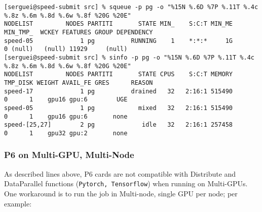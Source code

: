 
\scriptsize
\begin{verbatim}
[serguei@speed-submit src] % squeue -p pg -o "%15N %.6D %7P %.11T %.4c %.8z %.6m %.8d %.6w %.8f %20G %20E"
NODELIST         NODES PARTITI       STATE MIN_    S:C:T MIN_ME MIN_TMP_  WCKEY FEATURES GROUP DEPENDENCY
speed-05             1 pg          RUNNING    1    *:*:*     1G        0 (null)   (null) 11929     (null)
[serguei@speed-submit src] % sinfo -p pg -o "%15N %.6D %7P %.11T %.4c %.8z %.6m %.8d %.6w %.8f %20G %20E"
NODELIST         NODES PARTITI       STATE CPUS    S:C:T MEMORY TMP_DISK WEIGHT AVAIL_FE GRES      REASON
speed-17             1 pg          drained   32   2:16:1 515490        0      1    gpu16 gpu:6        UGE
speed-05             1 pg            mixed   32   2:16:1 515490        0      1    gpu16 gpu:6       none
speed-[25,27]        2 pg             idle   32   2:16:1 257458        0      1    gpu32 gpu:2       none
\end{verbatim}
\normalsize


\subsubsection{P6 on Multi-GPU, Multi-Node}

As described lines above, P6 cards are not compatible with Distribute and DataParallel functions
(\texttt{Pytorch, Tensorflow}) when running on Multi-GPUs.
One workaround is to run the job in Multi-node, single GPU per node; per example:

